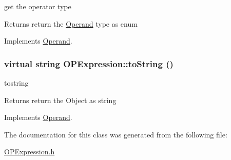 get the operator type \begin{DoxyReturn}{Returns}
return the \hyperlink{classOperand}{Operand} type as enum 
\end{DoxyReturn}


Implements \hyperlink{classOperand_af4bd7dab87bfd7f3c17ea84f07b02b69}{Operand}.\hypertarget{classOPExpression_a6a29cfb44936766a61099835482ea6d1}{
\subsubsection[{toString}]{\setlength{\rightskip}{0pt plus 5cm}virtual string OPExpression::toString ()}}
\label{classOPExpression_a6a29cfb44936766a61099835482ea6d1}


tostring \begin{DoxyReturn}{Returns}
return the Object as string 
\end{DoxyReturn}


Implements \hyperlink{classOperand_aaa9879d6c4fb8334c1b4d97dad614cef}{Operand}.

The documentation for this class was generated from the following file:\begin{DoxyCompactItemize}
\item 
\hyperlink{OPExpression_8h}{OPExpression.h}\end{DoxyCompactItemize}
